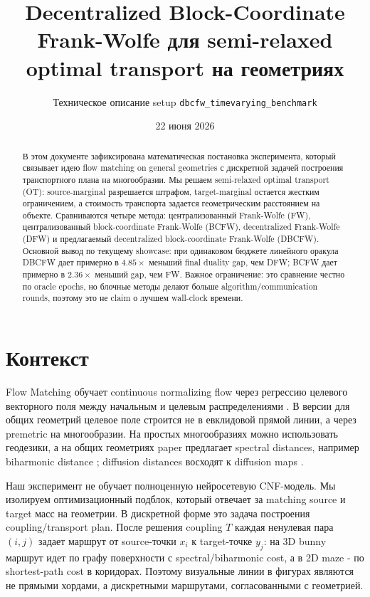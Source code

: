 \documentclass[11pt,a4paper]{article}
\title{\bfseries Decentralized Block-Coordinate Frank-Wolfe для semi-relaxed optimal transport на геометриях}
\author{Техническое описание setup \texttt{dbcfw\_timevarying\_benchmark}}
\date{22 июня 2026}
\newcommand{\method}[1]{\textsf{#1}}
\begin{document}
\maketitle

\begin{abstract}
В этом документе зафиксирована математическая постановка эксперимента, который связывает идею flow matching on general geometries с дискретной задачей построения транспортного плана на многообразии. Мы решаем semi-relaxed optimal transport (OT): source-marginal разрешается штрафом, target-marginal остается жестким ограничением, а стоимость транспорта задается геометрическим расстоянием на объекте. Сравниваются четыре метода: централизованный Frank-Wolfe (\method{FW}), централизованный block-coordinate Frank-Wolfe (\method{BCFW}), decentralized Frank-Wolfe (\method{DFW}) и предлагаемый decentralized block-coordinate Frank-Wolfe (\method{DBCFW}). Основной вывод по текущему showcase: при одинаковом бюджете линейного оракула \method{DBCFW} дает примерно в \(4.85\times\) меньший final duality gap, чем \method{DFW}; \method{BCFW} дает примерно в \(2.36\times\) меньший gap, чем \method{FW}. Важное ограничение: это сравнение честно по oracle epochs, но блочные методы делают больше algorithm/communication rounds, поэтому это не claim о лучшем wall-clock времени.
\end{abstract}

\section{Контекст}

Flow Matching обучает continuous normalizing flow через регрессию целевого векторного поля между начальным и целевым распределениями \citep{lipman2023flow}. В версии для общих геометрий \citep{chen2024flow} целевое поле строится не в евклидовой прямой линии, а через premetric на многообразии. На простых многообразиях можно использовать геодезики, а на общих геометриях paper предлагает spectral distances, например biharmonic distance \citep{lipman2010biharmonic}; diffusion distances восходят к diffusion maps \citep{coifman2006diffusion}.

Наш эксперимент не обучает полноценную нейросетевую CNF-модель. Мы изолируем оптимизационный подблок, который отвечает за matching source и target масс на геометрии. В дискретной форме это задача построения coupling/transport plan. После решения coupling \(T\) каждая ненулевая пара \((i,j)\) задает маршрут от source-точки \(x_i\) к target-точке \(y_j\): на 3D bunny маршрут идет по графу поверхности с spectral/biharmonic cost, а в 2D maze - по shortest-path cost в коридорах. Поэтому визуальные линии в фигурах являются не прямыми хордами, а дискретными маршрутами, согласованными с геометрией.
\end{document}
